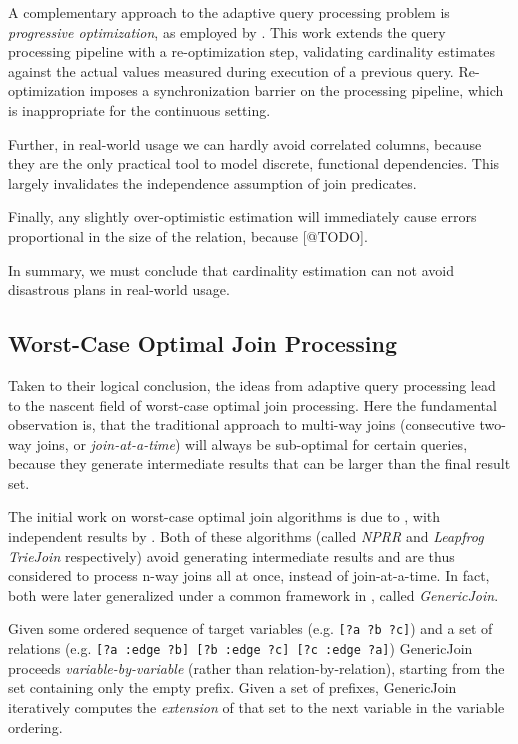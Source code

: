 \documentclass[../index.tex]{subfiles}
\begin{document}
A complementary approach to the adaptive query processing problem is
\emph{progressive optimization}, as employed by
\cite{markl2004robust}. This work extends the query processing
pipeline with a re-optimization step, validating cardinality estimates
against the actual values measured during execution of a previous
query. Re-optimization imposes a synchronization barrier on the
processing pipeline, which is inappropriate for the continuous
setting.

Further, in real-world usage we can hardly avoid correlated columns,
because they are the only practical tool to model discrete, functional
dependencies. This largely invalidates the independence assumption of
join predicates.

Finally, any slightly over-optimistic estimation will immediately
cause errors proportional in the size of the relation, because
[@TODO].

In summary, we must conclude that cardinality estimation can not avoid
disastrous plans in real-world usage.

\subsection{Worst-Case Optimal Join Processing} \label{technique-wco}

Taken to their logical conclusion, the ideas from adaptive query
processing lead to the nascent field of worst-case optimal join
processing. Here the fundamental observation is, that the traditional
approach to multi-way joins (consecutive two-way joins, or
\emph{join-at-a-time}) will always be sub-optimal for certain queries,
because they generate intermediate results that can be larger than the
final result set.

The initial work on worst-case optimal join algorithms is due to
\cite{ngo2012worst}, with independent results by
\cite{veldhuizen2012leapfrog}. Both of these algorithms (called
\emph{NPRR} and \emph{Leapfrog TrieJoin} respectively) avoid
generating intermediate results and are thus considered to process
n-way joins all at once, instead of join-at-a-time. In fact, both were
later generalized under a common framework in \cite{ngo2013skew},
called \emph{GenericJoin}.

Given some ordered sequence of target variables (e.g. \texttt{[?a ?b
    ?c]}) and a set of relations (e.g. \texttt{{[?a :edge ?b] [?b
      :edge ?c] [?c :edge ?a]}}) GenericJoin proceeds
\emph{variable-by-variable} (rather than relation-by-relation),
starting from the set containing only the empty prefix. Given a set of
prefixes, GenericJoin iteratively computes the \emph{extension} of
that set to the next variable in the variable ordering.
\end{document}
